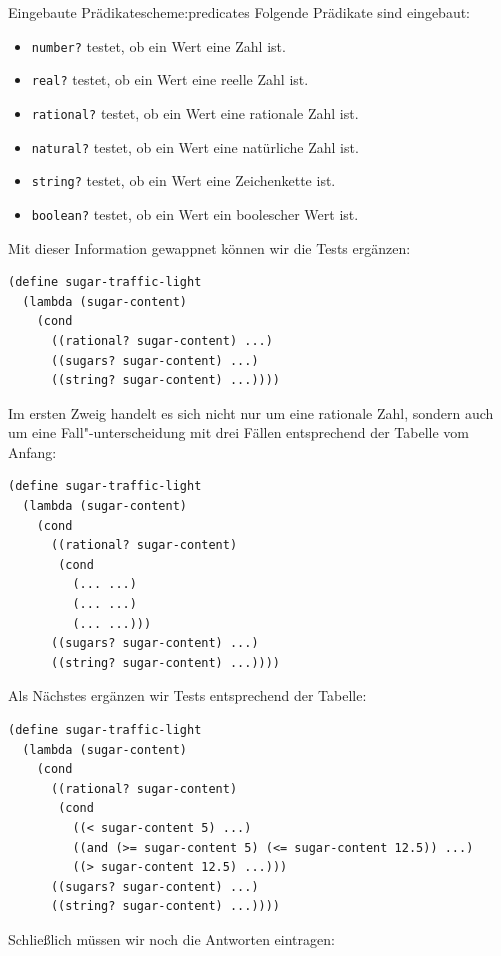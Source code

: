 \begin{feature}{Eingebaute Prädikate}{scheme:predicates}
  Folgende Prädikate sind eingebaut:
  \begin{itemize}
  \item \lstinline{number?} testet, ob ein Wert eine Zahl ist.
  \item \lstinline{real?} testet, ob ein Wert eine reelle Zahl ist.
  \item \lstinline{rational?} testet, ob ein Wert eine rationale Zahl ist.
  \item \lstinline{natural?} testet, ob ein Wert eine natürliche Zahl ist.
  \item \lstinline{string?} testet, ob ein Wert eine Zeichenkette ist.
  \item \lstinline{boolean?} testet, ob ein Wert ein boolescher Wert ist.
  \end{itemize}
\end{feature}
%
Mit dieser Information gewappnet können wir die Tests ergänzen:
%
\begin{lstlisting}
(define sugar-traffic-light
  (lambda (sugar-content)
    (cond
      ((rational? sugar-content) ...)
      ((sugars? sugar-content) ...)
      ((string? sugar-content) ...))))
\end{lstlisting}         
%
Im ersten Zweig handelt es sich nicht nur um eine rationale Zahl,
sondern auch um eine Fall"-unterscheidung mit drei Fällen entsprechend
der Tabelle vom Anfang:
%
\begin{lstlisting}
(define sugar-traffic-light
  (lambda (sugar-content)
    (cond
      ((rational? sugar-content) 
       (cond
         (... ...)
         (... ...)
         (... ...)))
      ((sugars? sugar-content) ...)
      ((string? sugar-content) ...))))
\end{lstlisting}         
%
Als Nächstes ergänzen wir Tests entsprechend der Tabelle:
%
\begin{lstlisting}
(define sugar-traffic-light
  (lambda (sugar-content)
    (cond
      ((rational? sugar-content) 
       (cond
         ((< sugar-content 5) ...)
         ((and (>= sugar-content 5) (<= sugar-content 12.5)) ...)
         ((> sugar-content 12.5) ...)))
      ((sugars? sugar-content) ...)
      ((string? sugar-content) ...))))
\end{lstlisting}         
%
Schließlich müssen wir noch die Antworten eintragen:
